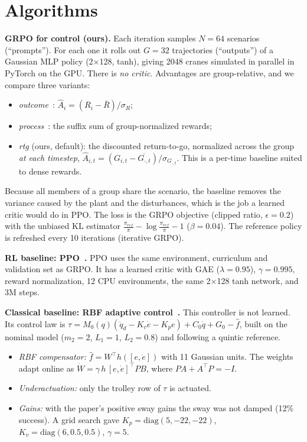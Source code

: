 \documentclass[10pt,conference]{IEEEtran}
\begin{document}
\section{Algorithms}
\textbf{GRPO for control (ours).} Each iteration samples $N=64$ scenarios (``prompts''). For each one it rolls out $G=32$ trajectories (``outputs'') of a Gaussian MLP policy (2$\times$128, tanh), giving 2048 cranes simulated in parallel in PyTorch on the GPU. There is \emph{no critic}. Advantages are group-relative, and we compare three variants:
\begin{itemize}
\item \emph{outcome}~\cite{grpo}: $\hat A_{i}=(R_i-\bar R)/\sigma_R$;
\item \emph{process}~\cite{grpo}: the suffix sum of group-normalized rewards;
\item \emph{rtg} (ours, default): the discounted return-to-go, normalized across the group \emph{at each timestep}, $\hat A_{i,t}=(G_{i,t}-\overline{G_{\cdot,t}})/\sigma_{G_{\cdot,t}}$. This is a per-time baseline suited to dense rewards.
\end{itemize}
Because all members of a group share the scenario, the baseline removes the variance caused by the plant and the disturbances, which is the job a learned critic would do in PPO. The loss is the GRPO objective (clipped ratio, $\epsilon=0.2$) with the unbiased KL estimator $\frac{\pi_{ref}}{\pi}-\log\frac{\pi_{ref}}{\pi}-1$ ($\beta=0.04$). The reference policy is refreshed every 10 iterations (iterative GRPO).

\textbf{RL baseline: PPO~\cite{ppo}.} PPO uses the same environment, curriculum and validation set as GRPO. It has a learned critic with GAE ($\lambda{=}0.95$), $\gamma{=}0.995$, reward normalization, 12 CPU environments, the same 2$\times$128 tanh network, and 3M steps.

\textbf{Classical baseline: RBF adaptive control~\cite{qiang2021}.} This controller is not learned. Its control law is
$\tau=M_0(q)(\ddot q_d-K_v\dot e-K_pe)+C_0\dot q+G_0-\hat f$,
built on the nominal model ($m_2{=}2$, $L_1{=}1$, $L_2{=}0.8$) and following a quintic reference.
\begin{itemize}
\item \emph{RBF compensator:} $\hat f=W^\top h([e,\dot e])$ with 11 Gaussian units. The weights adapt online as $\dot W=\gamma\,h\,[e,\dot e]^\top PB$, where $PA+A^\top P=-I$.
\item \emph{Underactuation:} only the trolley row of $\tau$ is actuated.
\item \emph{Gains:} with the paper's positive sway gains the sway was not damped (12\% success). A grid search gave $K_p{=}\mathrm{diag}(5,-22,-22)$, $K_v{=}\mathrm{diag}(6,0.5,0.5)$, $\gamma{=}5$.
\end{itemize}
\end{document}

